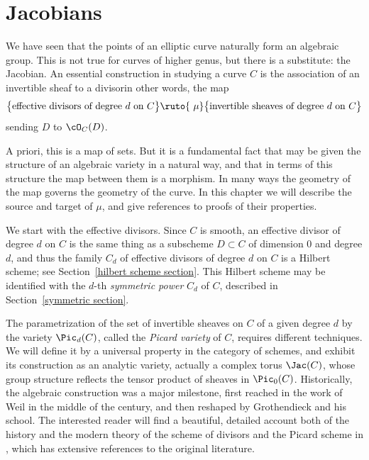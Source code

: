 

\chapter{Jacobians}\label{Jacobians chapter}\label{new Jacobians chapter}\label{JacobianChapter}

We have seen that the points of an elliptic curve naturally form an algebraic group. This is not true for curves of higher genus, but there is a substitute: the Jacobian. 
An essential construction in studying a curve $C$ is the association of an invertible sheaf to a divisor\emdash in other words, the map
$$
\big\{ \text{effective divisors of degree $d$ on $C$}\big\} \ruto{\ \mu} \big\{ \text{invertible sheaves of degree $d$ on $C$} \big\}
$$
sending $D$ to $\cO_C(D)$.

A priori, this is a map of sets. But it is a fundamental fact that 
may  be given the structure of an algebraic variety in a natural way,
and that in terms of this structure the map between them is a
morphism. In many ways the geometry of the map governs the geometry of
the curve. 
In this chapter we will describe the source and target of $\mu$, and give references to proofs of their properties. 

We start with the effective divisors. Since $C$ is smooth, an
%
%
effective divisor of degree $d$ on $C$ is the same thing as a
subscheme $D \subset C$ of dimension 0 and degree $d$, and thus
the family $C_d$ of effective divisors of degree $d$ on $C$ is a
Hilbert scheme; see Section~\ref{hilbert scheme section}. This Hilbert
%
scheme may be identified with
the $d$-th \emph{symmetric power} $C_d$  of $C$, described in Section~\ref{symmetric section}. 
%

The parametrization of the set of invertible sheaves on $C$ of a given
degree $d$ by the variety $\Pic_d(C)$, called the 
\emph{Picard variety} 
%
of $C$, requires different techniques. We will define it by
a universal property in the category of schemes, and exhibit its
construction as an analytic variety, actually a complex torus
%
%
$\Jac(C)$, whose group structure reflects the tensor product of
sheaves in $\Pic_0(C)$.
Historically, the algebraic construction was a major milestone, first
reached in the work of 
%
Weil in the middle of
the 
century, and then reshaped by Grothendieck and his school. 
%
The interested reader will find a beautiful, detailed account both of the history and the 
modern theory of the scheme of divisors and the Picard scheme in 
\cite{Kleiman-PicardScheme},
which has extensive references to the original literature. 

